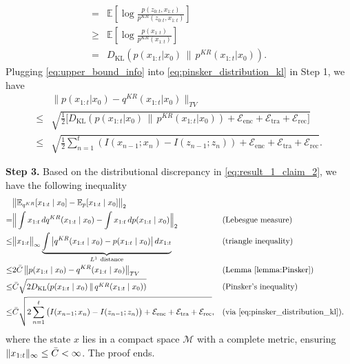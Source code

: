 \documentclass{article} %
\begin{document}
\begin{proofwithframe}
\begin{equation}
\begin{split}
     = &  \mathbb{E} [ \log \frac{p(z_{0:t}, x_{1:t})}{p^{KR}(z_{0:t}, x_{1:t})} ] \\
     \geq & \mathbb{E} [ \log \frac{p(x_{1:t})}{p^{KR}(x_{1:t})} ] \\
     = & D_{\mathrm{KL}} \left( p(x_{1:t} | x_0) \,\|\, p^{KR}(x_{1:t} | x_0) \right).
\end{split}
\end{equation}
Plugging \eqref{eq:upper_bound_info} into \eqref{eq:pinsker_distribution_kl} in Step 1, we have 
\begin{equation} \label{eq:result_1_claim_2}
\begin{split}
          & \bigg\| p(x_{1:t} | x_0) - q^{KR}(x_{1:t} | x_0) \bigg\|_{TV} \\
          \leq  & \sqrt{\frac{1}{2}\big[D_{\mathrm{KL}}\left( p(x_{1:t} | x_0) \,\|\, p^{KR}(x_{1:t} | x_0)\right) + \mathcal{E}_{\text{enc}} + \mathcal{E}_{\text{tra}} + \mathcal{E}_{\text{rec}}\big]} \\
        \leq &   \sqrt{\frac{1}{2} \sum_{n=1}^{t} ( I(x_{n-1}; x_{n}) - I(z_{n-1}; z_{n})) +\mathcal{E}_{\text{enc}} + \mathcal{E}_{\text{tra}} + \mathcal{E}_{\text{rec}} }.
\end{split}
\end{equation}

\textbf{Step 3.} Based on the distributional discrepancy in \eqref{eq:result_1_claim_2}, we have the following inequality
\begin{align*}
     & \big \| \mathbb{E}_{q^{KR}}[x_{1:t} \mid x_0] - \mathbb{E}_p[x_{1:t} \mid x_0] \big\|_2 \\
     = & \Big \| \int x_{1:t} \, dq^{KR}(x_{1:t} \mid x_0) -  \int x_{1:t} \, dp(x_{1:t} \mid x_0) \Big\|_2 
     && \text{(Lebesgue measure)} \\
     \leq & \big \| x_{1:t} \big\|_{\infty} \underbrace{\int \big|q^{KR}(x_{1:t} \mid x_0) - p(x_{1:t} \mid x_0)\big| \, dx_{1:t} }_{L^1 \ \text{distance}}
     && \text{(triangle inequality)} \\
     \leq & 2\Bar{C} \, \big\| p(x_{1:t} \mid x_0) - q^{KR}(x_{1:t} \mid x_0) \big\|_{TV} 
     && \text{(Lemma~\ref{lemma:Pinsker})} \\
     \leq & \Bar{C} \sqrt{2 D_{\mathrm{KL}}(p(x_{1:t} \mid x_0) \,\|\, q^{KR}(x_{1:t} \mid x_0))} 
     && \text{(Pinsker's inequality)} \\
     \leq & \Bar{C} \sqrt{2 \sum_{n=1}^{t} \big( I(x_{n-1}; x_{n}) - I(z_{n-1}; z_{n}) \big) 
             + \mathcal{E}_{\text{enc}} + \mathcal{E}_{\text{tra}} + \mathcal{E}_{\text{rec}} },
     && \text{(via \eqref{eq:pinsker_distribution_kl}).}
\end{align*}
where the state $x$ lies in a compact space $\mathcal{M}$ with a complete metric, ensuring $\|x_{1:t} \|_{\infty} \leq \Bar{C} < \infty$. The proof ends. 


\end{proofwithframe}
\end{document}
